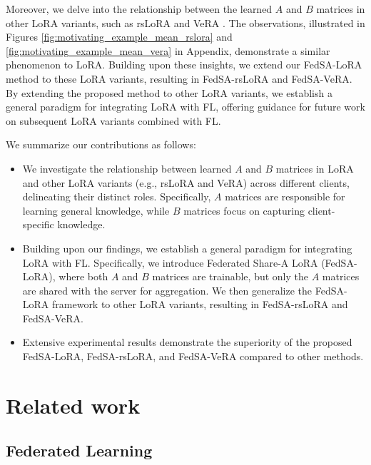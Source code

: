 \documentclass{article} %
\begin{document}
Moreover, we delve into the relationship between the learned $A$ and $B$ matrices in other LoRA variants, such as rsLoRA \citep{kalajdzievski2023rank} and VeRA \citep{kopiczko2024vera}. The observations, illustrated in Figures \ref{fig:motivating_example_mean_rslora} and \ref{fig:motivating_example_mean_vera} in Appendix, demonstrate a similar phenomenon to LoRA. Building upon these insights, we extend our FedSA-LoRA method to these LoRA variants, resulting in FedSA-rsLoRA and FedSA-VeRA. By extending the proposed method to other LoRA variants, we establish a general paradigm for integrating LoRA with FL, offering guidance for future work on subsequent LoRA variants combined with FL.

We summarize our contributions as follows:
\begin{itemize}
    \item We investigate the relationship between learned $A$ and $B$ matrices in LoRA and other LoRA variants (e.g., rsLoRA and VeRA) across different clients, delineating their distinct roles. Specifically, $A$ matrices are responsible for learning general knowledge, while $B$ matrices focus on capturing client-specific knowledge. 
    \item Building upon our findings, we establish a general paradigm for integrating LoRA with FL. Specifically, we introduce Federated Share-A LoRA (FedSA-LoRA), where both $A$ and $B$ matrices are trainable, but only the $A$ matrices are shared with the server for aggregation. We then generalize the FedSA-LoRA framework to other LoRA variants, resulting in FedSA-rsLoRA and FedSA-VeRA.
    \item Extensive experimental results demonstrate the superiority of the proposed FedSA-LoRA, FedSA-rsLoRA, and FedSA-VeRA compared to other methods.
\end{itemize}


\section{Related work} \label{sec:related_work}

\subsection{Federated Learning}
\end{document}
